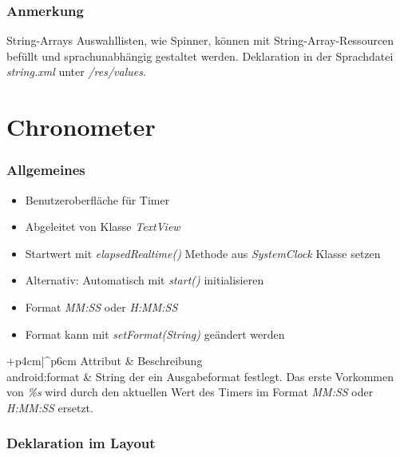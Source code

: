 \begin{frame}
   \frametitle{Anmerkung}
	\begin{alertblock}{String-Arrays}
		Auswahllisten, wie Spinner, können mit String-Array-Ressourcen befüllt und 
		sprachunabhängig gestaltet werden. Deklaration in der Sprachdatei 
		\emph{string.xml} unter \emph{/res/values}. 

		\vspace{3mm}

		
	\end{alertblock}
\end{frame}

\section{Chronometer}
\begin{frame}[label=chronometer]
   \frametitle{Allgemeines}
   \begin{itemize}
      \item Benutzeroberfläche für Timer
      \item Abgeleitet von Klasse \emph{TextView}
      \item Startwert mit \emph{elapsedRealtime()} Methode aus 
         \emph{SystemClock} Klasse setzen
      \item Alternativ: Automatisch mit \emph{start()} initialisieren
      \item Format \emph{MM:SS} oder \emph{H:MM:SS}
      \item Format kann mit \emph{setFormat(String)} geändert werden
   \end{itemize}

   \begin{attrDesc}{+p{4cm}|^p{6cm}}
      Attribut & Beschreibung\\
      \hline
      android:format & String der ein Ausgabeformat festlegt. Das erste Vorkommen 
         von \emph{\%s} wird durch den aktuellen Wert des Timers im Format 
         \emph{MM:SS} oder \emph{H:MM:SS} ersetzt.\\
   \end{attrDesc}
\end{frame}

\begin{frame}
   \frametitle{Deklaration im Layout}
   
\end{frame}

